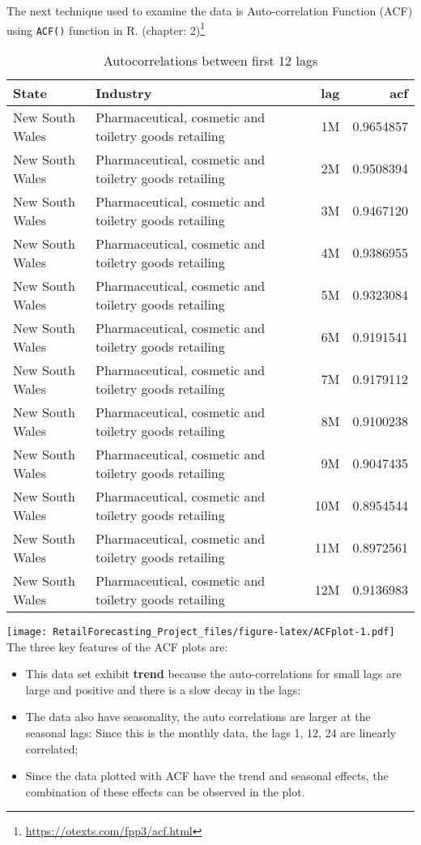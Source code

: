 \documentclass[
]{article}
\begin{document}
The next technique used to examine the data is Auto-correlation Function
(ACF) using \texttt{ACF()} function in R. (chapter: 2)\footnote{\url{https://otexts.com/fpp3/acf.html}}

\begin{table}

\caption{\label{tab:ACF}Autocorrelations between first 12 lags}
\centering
\begin{tabular}[t]{l|l|r|r}
\hline
State & Industry & lag & acf\\
\hline
New South Wales & Pharmaceutical, cosmetic and toiletry goods retailing & 1M & 0.9654857\\
\hline
New South Wales & Pharmaceutical, cosmetic and toiletry goods retailing & 2M & 0.9508394\\
\hline
New South Wales & Pharmaceutical, cosmetic and toiletry goods retailing & 3M & 0.9467120\\
\hline
New South Wales & Pharmaceutical, cosmetic and toiletry goods retailing & 4M & 0.9386955\\
\hline
New South Wales & Pharmaceutical, cosmetic and toiletry goods retailing & 5M & 0.9323084\\
\hline
New South Wales & Pharmaceutical, cosmetic and toiletry goods retailing & 6M & 0.9191541\\
\hline
New South Wales & Pharmaceutical, cosmetic and toiletry goods retailing & 7M & 0.9179112\\
\hline
New South Wales & Pharmaceutical, cosmetic and toiletry goods retailing & 8M & 0.9100238\\
\hline
New South Wales & Pharmaceutical, cosmetic and toiletry goods retailing & 9M & 0.9047435\\
\hline
New South Wales & Pharmaceutical, cosmetic and toiletry goods retailing & 10M & 0.8954544\\
\hline
New South Wales & Pharmaceutical, cosmetic and toiletry goods retailing & 11M & 0.8972561\\
\hline
New South Wales & Pharmaceutical, cosmetic and toiletry goods retailing & 12M & 0.9136983\\
\hline
\end{tabular}
\end{table}

\texttt{[image: RetailForecasting\_Project\_files/figure-latex/ACFplot-1.pdf]}
The three key features of the ACF plots are:

\begin{itemize}
\item
  This data set exhibit \textbf{trend} because the auto-correlations for
  small lags are large and positive and there is a slow decay in the
  lags:
\item
  The data also have seasonality, the auto correlations are larger at
  the seasonal lags: Since this is the monthly data, the lags 1, 12, 24
  are linearly correlated;
\item
  Since the data plotted with ACF have the trend and seasonal effects,
  the combination of these effects can be observed in the plot.
\end{itemize}
\end{document}
